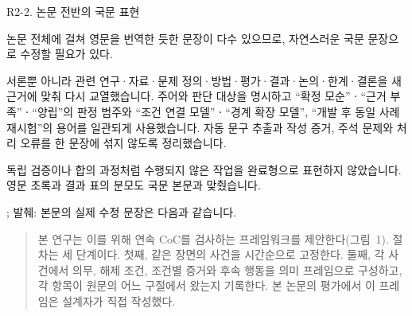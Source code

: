 \begin{reviewitem}{R2-2. 논문 전반의 국문 표현}

\begin{reviewercomment}

논문 전체에 걸쳐 영문을 번역한 듯한 문장이 다수 있으므로, 자연스러운 국문 문장으로 수정할 필요가 있다.

\end{reviewercomment}

\begin{authorresponse}

서론뿐 아니라 관련 연구·자료·문제 정의·방법·평가·결과·논의·한계·결론을 새 근거에 맞춰 다시 교열했습니다. 주어와 판단 대상을 명시하고 ``확정 모순''ㆍ``근거 부족''ㆍ``양립''의 판정 범주와 ``조건 연결 모델''ㆍ``경계 확장 모델'', ``개발 후 동일 사례 재시험''의 용어를 일관되게 사용했습니다. 자동 문구 추출과 작성 증거, 주석 문제와 처리 오류를 한 문장에 섞지 않도록 정리했습니다.

독립 검증이나 합의 과정처럼 수행되지 않은 작업을 완료형으로 표현하지 않았습니다. 영문 초록과 결과 표의 분모도 국문 본문과 맞췄습니다.

\end{authorresponse}

\begin{manuscriptrevision}{; 발췌: }
본문의 실제 수정 문장은 다음과 같습니다.

\begin{quote}
본 연구는 이를 위해 연속 CoC를 검사하는 프레임워크를 제안한다(그림~1). 절차는 세 단계이다. 첫째, 같은 장면의 사건을 시간순으로 고정한다. 둘째, 각 사건에서 의무, 해제 조건, 조건별 증거와 후속 행동을 의미 프레임으로 구성하고, 각 항목이 원문의 어느 구절에서 왔는지 기록한다. 본 논문의 평가에서 이 프레임은 설계자가 직접 작성했다.
\end{quote}
\end{manuscriptrevision}

\end{reviewitem}

\clearpage

